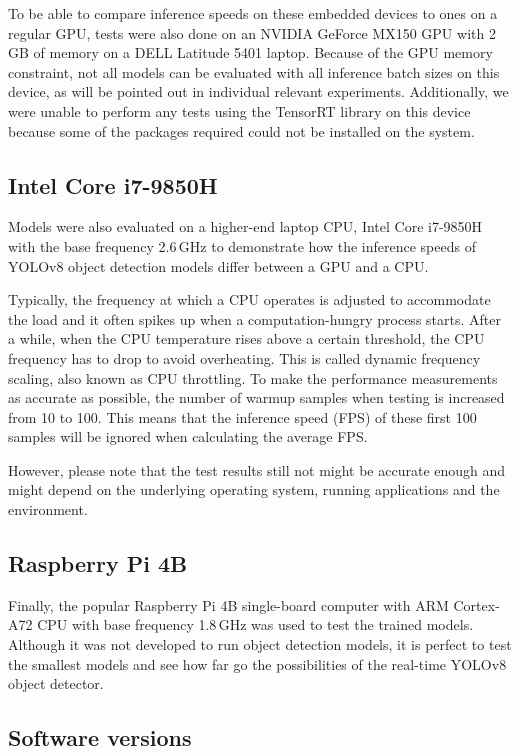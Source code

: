 To be able to compare inference speeds on these embedded devices to ones on a
regular GPU, tests were also done on an NVIDIA GeForce MX150 GPU with 2\,GB of
memory on a DELL Latitude 5401 laptop. Because of the GPU memory constraint, not
all models can be evaluated with all inference batch sizes on this device, as
will be pointed out in individual relevant experiments. Additionally, we were
unable to perform any tests using the TensorRT library on this device because
some of the packages required could not be installed on the system.


\subsection{Intel Core i7-9850H}

Models were also evaluated on a higher-end laptop CPU, Intel Core i7-9850H with
the base frequency 2.6\,GHz to demonstrate how the inference speeds of YOLOv8
object detection models differ between a GPU and a CPU.

Typically, the frequency at which a CPU operates is adjusted to accommodate the
load and it often spikes up when a computation-hungry process starts. After a
while, when the CPU temperature rises above a certain threshold, the CPU
frequency has to drop to avoid overheating. This is called dynamic frequency
scaling, also known as CPU throttling. To make the performance measurements as
accurate as possible, the number of warmup samples when testing is increased
from 10 to 100. This means that the inference speed (FPS) of these first 100
samples will be ignored when calculating the average FPS.

However, please note that the test results still not might be accurate enough
and might depend on the underlying operating system, running applications and
the environment.


\subsection{Raspberry Pi 4B}

Finally, the popular Raspberry Pi 4B single-board computer with ARM Cortex-A72
CPU with base frequency 1.8\,GHz was used to test the trained models. Although it
was not developed to run object detection models, it is perfect to test the
smallest models and see how far go the possibilities of the real-time YOLOv8
object detector.


\subsection{Software versions}

